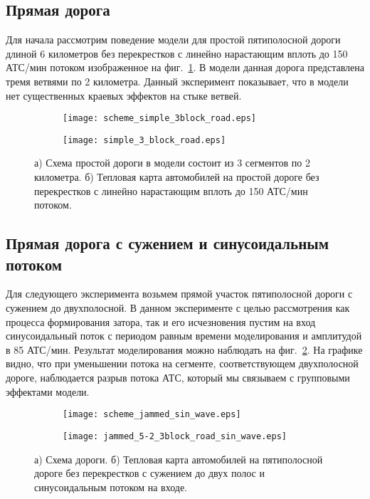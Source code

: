\subsection{Прямая дорога}
Для начала рассмотрим поведение модели для простой пятиполосной дороги длиной 6 километров без перекрестков с линейно нарастающим вплоть до 150 АТС/мин потоком изображенное на фиг.~\ref{fig:simple_road}. В модели данная дорога представлена тремя ветвями по 2 километра.
Данный эксперимент показывает, что в модели нет существенных краевых эффектов на стыке ветвей.
\begin{figure}[ht]
    \begin{subfigure}[b][][b]{1.0\textwidth}
       \texttt{[image: scheme\_simple\_3block\_road.eps]}
       \caption{}
    \end{subfigure}

    \begin{subfigure}[b][][b]{1.0\textwidth}
       \texttt{[image: simple\_3\_block\_road.eps]}
       \caption{}
    \end{subfigure}

    \caption{а) Схема простой дороги в модели состоит из 3 сегментов по 2 километра. б) Тепловая карта автомобилей на простой дороге без перекрестков с линейно нарастающим вплоть до 150 АТС/мин потоком.}
    \label{fig:simple_road}
\end{figure}

\subsection{Прямая дорога с сужением и синусоидальным потоком}
Для следующего эксперимента возьмем прямой участок пятиполосной дороги с сужением до двухполосной.
В данном эксперименте с целью рассмотрения как процесса формирования затора, так и его исчезновения пустим на вход синусоидальный поток с периодом равным времени моделирования и амплитудой в 85 АТС/мин.
Результат моделирования можно наблюдать на фиг.~\ref{fig:jammed_5-2_3block_road_sin_wave}.
На графике видно, что при уменьшении потока на сегменте, соответствующем двухполосной дороге, наблюдается разрыв потока АТС, который мы связываем с групповыми эффектами модели.
\begin{figure}[ht]
    \begin{subfigure}[b][][b]{1.0\textwidth}
       \texttt{[image: scheme\_jammed\_sin\_wave.eps]}
       \caption{}
    \end{subfigure}

    \begin{subfigure}[b][][b]{1.0\textwidth}
       \texttt{[image: jammed\_5-2\_3block\_road\_sin\_wave.eps]}
       \caption{}
    \end{subfigure}

    \caption{а) Схема дороги. б) Тепловая карта автомобилей на пятиполосной дороге без перекрестков с сужением до двух полос и синусоидальным потоком на входе.}
    \label{fig:jammed_5-2_3block_road_sin_wave}
\end{figure}

